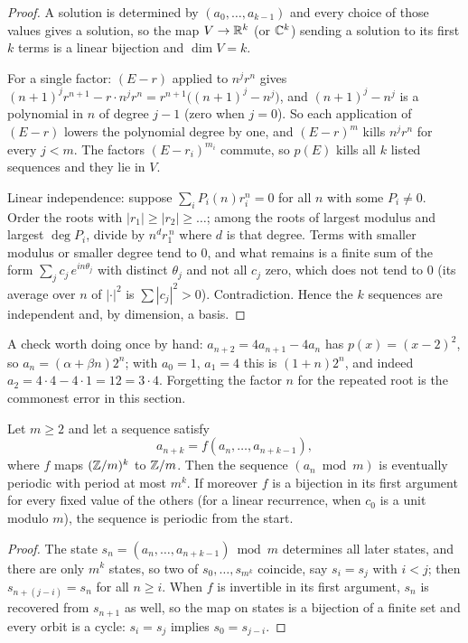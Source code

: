 \begin{proof}
A solution is determined by $(a_0,\dots,a_{k-1})$ and every choice of those values gives a solution, so the map $V\to\mathbb{R}^k$ (or $\mathbb{C}^k$) sending a solution to its first $k$ terms is a linear bijection and $\dim V=k$.

For a single factor: $(E-r)$ applied to $n^jr^n$ gives $(n+1)^jr^{n+1}-r\cdot n^jr^n=r^{n+1}\bigl((n+1)^j-n^j\bigr)$, and $(n+1)^j-n^j$ is a polynomial in $n$ of degree $j-1$ (zero when $j=0$). So each application of $(E-r)$ lowers the polynomial degree by one, and $(E-r)^{m}$ kills $n^jr^n$ for every $j<m$. The factors $(E-r_i)^{m_i}$ commute, so $p(E)$ kills all $k$ listed sequences and they lie in $V$.

Linear independence: suppose $\sum_iP_i(n)r_i^n=0$ for all $n$ with some $P_i\ne 0$. Order the roots with $|r_1|\ge|r_2|\ge\dots$; among the roots of largest modulus and largest $\deg P_i$, divide by $n^{d}r_1^{\,n}$ where $d$ is that degree. Terms with smaller modulus or smaller degree tend to $0$, and what remains is a finite sum of the form $\sum_j c_j\,e^{in\theta_j}$ with distinct $\theta_j$ and not all $c_j$ zero, which does not tend to $0$ (its average over $n$ of $|\cdot|^2$ is $\sum|c_j|^2>0$). Contradiction. Hence the $k$ sequences are independent and, by dimension, a basis.
\end{proof}

A check worth doing once by hand: $a_{n+2}=4a_{n+1}-4a_n$ has $p(x)=(x-2)^2$, so $a_n=(\alpha+\beta n)2^n$; with $a_0=1$, $a_1=4$ this is $(1+n)2^n$, and indeed $a_2=4\cdot4-4\cdot1=12=3\cdot 4$. Forgetting the factor $n$ for the repeated root is the commonest error in this section.

\begin{proposition}
Let $m\ge 2$ and let a sequence satisfy
\[
a_{n+k}=f(a_n,\dots,a_{n+k-1}),
\]
where $f$ maps $(\mathbb{Z}/m)^k$ to $\mathbb{Z}/m$. Then the sequence $(a_n \bmod m)$ is eventually periodic with period at most $m^k$. If moreover $f$ is a bijection in its first argument for every fixed value of the others (for a linear recurrence, when $c_0$ is a unit modulo $m$), the sequence is periodic from the start.
\end{proposition}

\begin{proof}
The state $s_n=(a_n,\dots,a_{n+k-1})\bmod m$ determines all later states, and there are only $m^k$ states, so two of $s_0,\dots,s_{m^k}$ coincide, say $s_i=s_j$ with $i<j$; then $s_{n+(j-i)}=s_n$ for all $n\ge i$. When $f$ is invertible in its first argument, $s_{n}$ is recovered from $s_{n+1}$ as well, so the map on states is a bijection of a finite set and every orbit is a cycle: $s_i=s_j$ implies $s_0=s_{j-i}$.
\end{proof}

